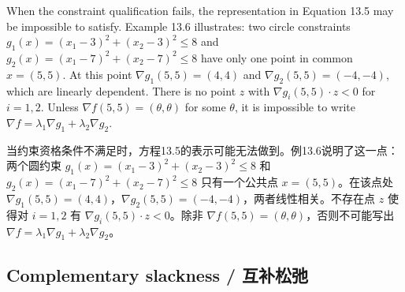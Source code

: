 \begin{original}
When the constraint qualification fails, the representation in Equation 13.5 may be impossible to satisfy. Example 13.6 illustrates: two circle constraints $g_1(x) = (x_1 - 3)^2 + (x_2 - 3)^2 \le 8$ and $g_2(x) = (x_1 - 7)^2 + (x_2 - 7)^2 \le 8$ have only one point in common $x = (5,5)$. At this point $\nabla g_1(5,5) = (4,4)$ and $\nabla g_2(5,5) = (-4,-4)$, which are linearly dependent. There is no point $z$ with $\nabla g_i(5,5) \cdot z < 0$ for $i = 1,2$. Unless $\nabla f(5,5) = (\theta,\theta)$ for some $\theta$, it is impossible to write $\nabla f = \lambda_1 \nabla g_1 + \lambda_2 \nabla g_2$.
\end{original}
\begin{translation}
当约束资格条件不满足时，方程13.5的表示可能无法做到。例13.6说明了这一点：两个圆约束 $g_1(x) = (x_1 - 3)^2 + (x_2 - 3)^2 \le 8$ 和 $g_2(x) = (x_1 - 7)^2 + (x_2 - 7)^2 \le 8$ 只有一个公共点 $x = (5,5)$。在该点处 $\nabla g_1(5,5) = (4,4)$，$\nabla g_2(5,5) = (-4,-4)$，两者线性相关。不存在点 $z$ 使得对 $i = 1,2$ 有 $\nabla g_i(5,5) \cdot z < 0$。除非 $\nabla f(5,5) = (\theta,\theta)$，否则不可能写出 $\nabla f = \lambda_1 \nabla g_1 + \lambda_2 \nabla g_2$。
\end{translation}

\subsection{Complementary slackness / 互补松弛}


